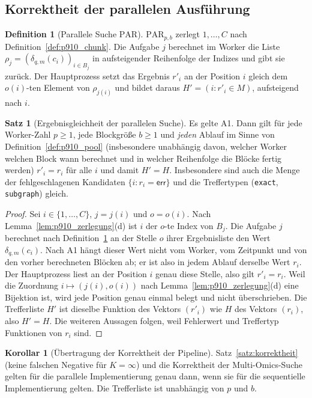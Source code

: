 \documentclass[a4paper,12pt, twoside]{report}
\theoremstyle{definition}
\newtheorem{definition}{Definition}
\newtheorem{satz}{Satz}
\newtheorem{korollar}{Korollar}
\begin{document}
\subsection{Korrektheit der parallelen Ausführung}
\label{sec:p910_korrektheit}

\begin{definition}[Parallele Suche $\mathrm{PAR}$]
\label{def:p910_par}
$\mathrm{PAR}_{p,b}$ zerlegt $1,\dots,C$ nach Definition~\ref{def:p910_chunk}. Die Aufgabe $j$ berechnet im Worker die Liste $\rho_j=(\delta_{q,m}(c_i))_{i\in B_j}$ in aufsteigender Reihenfolge der Indizes und gibt sie zurück. Der Hauptprozess setzt das Ergebnis $r'_i$ an der Position $i$ gleich dem $o(i)$-ten Element von $\rho_{j(i)}$ und bildet daraus $H'=(i:r'_i\in M)$, aufsteigend nach $i$.
\end{definition}

\begin{satz}[Ergebnisgleichheit der parallelen Suche]
\label{satz:p910_gleich}
Es gelte A1. Dann gilt für jede Worker-Zahl $p\ge 1$, jede Blockgröße $b\ge 1$ und \emph{jeden} Ablauf im Sinne von Definition~\ref{def:p910_pool} (insbesondere unabhängig davon, welcher Worker welchen Block wann berechnet und in welcher Reihenfolge die Blöcke fertig werden) $r'_i=r_i$ für alle $i$ und damit $H'=H$. Insbesondere sind auch die Menge der fehlgeschlagenen Kandidaten $\{i:r_i=\mathsf{err}\}$ und die Treffertypen (\texttt{exact}, \texttt{subgraph}) gleich.
\end{satz}

\begin{proof}
Sei $i\in\{1,\dots,C\}$, $j=j(i)$ und $o=o(i)$. Nach Lemma~\ref{lem:p910_zerlegung}(d) ist $i$ der $o$-te Index von $B_j$. Die Aufgabe $j$ berechnet nach Definition~\ref{def:p910_par} an der Stelle $o$ ihrer Ergebnisliste den Wert $\delta_{q,m}(c_i)$. Nach A1 hängt dieser Wert nicht vom Worker, vom Zeitpunkt und von den vorher berechneten Blöcken ab; er ist also in jedem Ablauf derselbe Wert $r_i$. Der Hauptprozess liest an der Position $i$ genau diese Stelle, also gilt $r'_i=r_i$. Weil die Zuordnung $i\mapsto(j(i),o(i))$ nach Lemma~\ref{lem:p910_zerlegung}(d) eine Bijektion ist, wird jede Position genau einmal belegt und nicht überschrieben. Die Trefferliste $H'$ ist dieselbe Funktion des Vektors $(r'_i)$ wie $H$ des Vektors $(r_i)$, also $H'=H$. Die weiteren Aussagen folgen, weil Fehlerwert und Treffertyp Funktionen von $r_i$ sind.
\end{proof}

\begin{korollar}[Übertragung der Korrektheit der Pipeline]
\label{kor:p910_korrekt}
Satz~\ref{satz:korrektheit} (keine falschen Negative für $K=\infty$) und die Korrektheit der Multi-Omics-Suche gelten für die parallele Implementierung genau dann, wenn sie für die sequentielle Implementierung gelten. Die Trefferliste ist unabhängig von $p$ und $b$.
\end{korollar}
\end{document}
